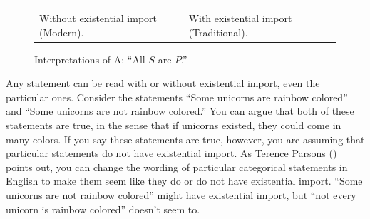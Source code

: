 \begin{figure}
\begin{mdframed}[style=mytablebox]
\begin{tabu}{X[1,c,m]X[1,c,m]}


&


\\

Without existential import
(Modern).

&

With existential import
(Traditional).

\end{tabu}
\end{mdframed}
\caption{Interpretations of A: ``All $S$ are $P$.''}
\label{fig:existential_import}
\end{figure}

Any statement can be read with or without existential import, even the particular ones. Consider the statements ``Some unicorns are rainbow colored'' and ``Some unicorns are not rainbow colored.'' You can argue that both of these statements are true, in the sense that if unicorns existed, they could come in many colors. If you say these statements are true, however, you are assuming that particular statements do not have existential import. As Terence Parsons (\cite*{Parsons1997}) points out, you can change the wording of particular categorical statements in English to make them seem like they do or do not have existential import. ``Some unicorns are not rainbow colored'' might have existential import, but ``not every unicorn is rainbow colored'' doesn't seem to.

